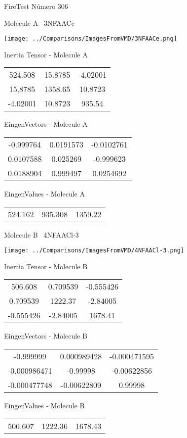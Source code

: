 \vtab[-3cm]
\begin{center}
{\large FireTest \tab Número 306}
\end{center}
\begin{multicols}{2}
\begin{center}

Molecule A \
3NFAACe

\texttt{[image: ../Comparisons/ImagesFromVMD/3NFAACe.png]}

Inertia Tensor - Molecule A \\
\begin{tabular}{|c c c|}
524.508	 & 	15.8785	 & 	-4.02001	 \\
15.8785	 & 	1358.65	 & 	10.8723	 \\
-4.02001	 & 	10.8723	 & 	935.54
\end{tabular}

\vtab
 EingenVectors - Molecule A     \\
\begin{tabular}{|c c c|}
-0.999764	 & 	0.0191573	 & 	-0.0102761	 \\
0.0107588	 & 	0.025269	 & 	-0.999623	 \\
0.0188904	 & 	0.999497	 & 	0.0254692
\end{tabular}

\vtab
 EingenValues - Molecule A     \\
\begin{tabular}{|c c c|}
524.162	 & 	935.308	 & 	1359.22	 \\
\end{tabular}
\columnbreak

Molecule B \
4NFAACl-3

\texttt{[image: ../Comparisons/ImagesFromVMD/4NFAACl-3.png]}

Inertia Tensor - Molecule B \\
\begin{tabular}{|c c c|}
506.608	 & 	0.709539	 & 	-0.555426	 \\
0.709539	 & 	1222.37	 & 	-2.84005	 \\
-0.555426	 & 	-2.84005	 & 	1678.41
\end{tabular}

\vtab
 EingenVectors - Molecule B     \\
\begin{tabular}{|c c c|}
-0.999999	 & 	0.000989428	 & 	-0.000471595	 \\
-0.000986471	 & 	-0.99998	 & 	-0.00622856	 \\
-0.000477748	 & 	-0.00622809	 & 	0.99998
\end{tabular}

\vtab
 EingenValues - Molecule B     \\
\begin{tabular}{|c c c|}
506.607	 & 	1222.36	 & 	1678.43	 \\
\end{tabular}

\end{center}
\end{multicols}

